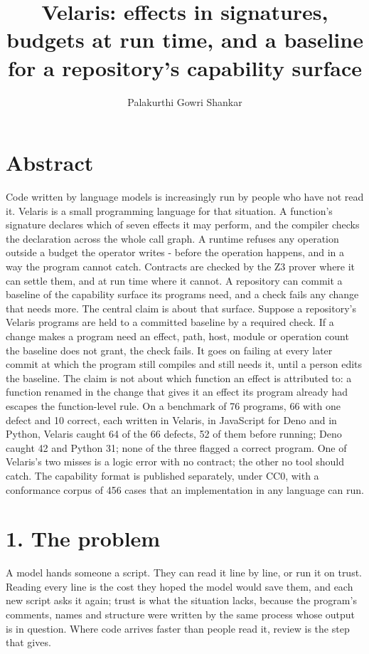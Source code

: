 \documentclass[
]{article}
\title{Velaris: effects in signatures, budgets at run time, and a
baseline for a repository's capability surface}
\author{Palakurthi Gowri Shankar}
\date{}
\newcounter{none} %
\begin{document}
\maketitle

\section{Abstract}\label{abstract}

Code written by language models is increasingly run by people who have
not read it. Velaris is a small programming language for that situation.
A function's signature declares which of seven effects it may perform,
and the compiler checks the declaration across the whole call graph. A
runtime refuses any operation outside a budget the operator writes -
before the operation happens, and in a way the program cannot catch.
Contracts are checked by the Z3 prover where it can settle them, and at
run time where it cannot. A repository can commit a baseline of the
capability surface its programs need, and a check fails any change that
needs more. The central claim is about that surface. Suppose a
repository's Velaris programs are held to a committed baseline by a
required check. If a change makes a program need an effect, path, host,
module or operation count the baseline does not grant, the check fails.
It goes on failing at every later commit at which the program still
compiles and still needs it, until a person edits the baseline. The
claim is not about which function an effect is attributed to: a function
renamed in the change that gives it an effect its program already had
escapes the function-level rule. On a benchmark of 76 programs, 66 with
one defect and 10 correct, each written in Velaris, in JavaScript for
Deno and in Python, Velaris caught 64 of the 66 defects, 52 of them
before running; Deno caught 42 and Python 31; none of the three flagged
a correct program. One of Velaris's two misses is a logic error with no
contract; the other no tool should catch. The capability format is
published separately, under CC0, with a conformance corpus of 456 cases
that an implementation in any language can run.

\section{1. The problem}\label{the-problem}

A model hands someone a script. They can read it line by line, or run it
on trust. Reading every line is the cost they hoped the model would save
them, and each new script asks it again; trust is what the situation
lacks, because the program's comments, names and structure were written
by the same process whose output is in question. Where code arrives
faster than people read it, review is the step that gives.
\end{document}

